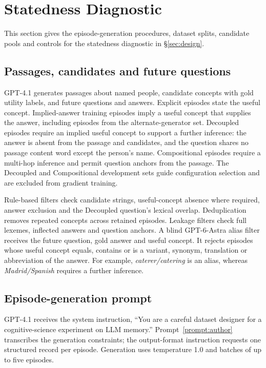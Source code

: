 \raggedbottom

\section{Statedness Diagnostic}
\label{app:benchmarks}

This section gives the episode-generation procedures, dataset splits, candidate pools and controls for the statedness diagnostic in \S\ref{sec:design}.


\subsection{Passages, candidates and future questions}

GPT-4.1 generates passages about named people, candidate concepts with gold utility labels, and future questions and answers. Explicit episodes state the useful concept. Implied-answer training episodes imply a useful concept that supplies the answer, including episodes from the alternate-generator set. Decoupled episodes require an implied useful concept to support a further inference: the answer is absent from the passage and candidates, and the question shares no passage content word except the person's name. Compositional episodes require a multi-hop inference and permit question anchors from the passage. The Decoupled and Compositional development sets guide configuration selection and are excluded from gradient training.

Rule-based filters check candidate strings, useful-concept absence where required, answer exclusion and the Decoupled question's lexical overlap. Deduplication removes repeated concepts across retained episodes. Leakage filters check full lexemes, inflected answers and question anchors. A blind GPT-6-Astra alias filter receives the future question, gold answer and useful concept. It rejects episodes whose useful concept equals, contains or is a variant, synonym, translation or abbreviation of the answer. For example, \emph{caterer/catering} is an alias, whereas \emph{Madrid/Spanish} requires a further inference.


\subsection{Episode-generation prompt}
\label{app:authorprompt}
GPT-4.1 receives the system instruction, ``You are a careful dataset designer for a cognitive-science experiment on LLM memory.'' Prompt~\ref{prompt:author} transcribes the generation constraints; the output-format instruction requests one structured record per episode. Generation uses temperature 1.0 and batches of up to five episodes.


